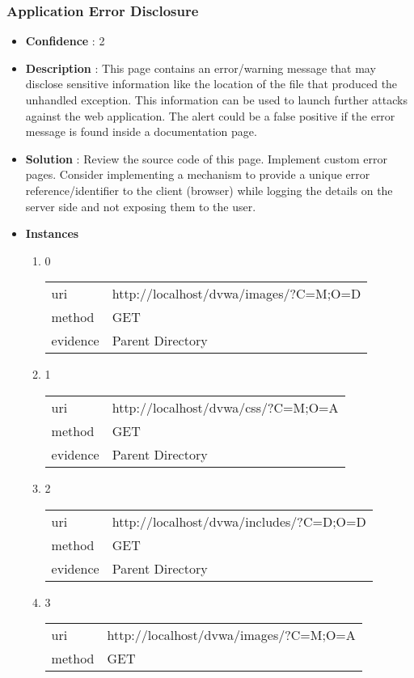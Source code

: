 \documentclass[10pt]{article}
\begin{document}
\subsubsection{Application Error Disclosure}
\begin{itemize}
\item[] \textbf{Confidence} : 2
\item[] \textbf{Description} : This page contains an error/warning message that may disclose sensitive information like the location of the file that produced the unhandled exception. This information can be used to launch further attacks against the web application. The alert could be a false positive if the error message is found inside a documentation page.
\item[] \textbf{Solution} :  Review the source code of this page. Implement custom error pages. Consider implementing a mechanism to provide a unique error reference/identifier to the client (browser) while logging the details on the server side and not exposing them to the user.
\item[] \textbf{Instances}
\begin{enumerate}
\item[] 0
\begin{tabular}{| l | p{12cm}}
uri & http://localhost/dvwa/images/?C=M;O=D \\
method & GET \\
evidence & Parent Directory \\
\end{tabular}
\item[] 1
\begin{tabular}{| l | p{12cm}}
uri & http://localhost/dvwa/css/?C=M;O=A \\
method & GET \\
evidence & Parent Directory \\
\end{tabular}
\item[] 2
\begin{tabular}{| l | p{12cm}}
uri & http://localhost/dvwa/includes/?C=D;O=D \\
method & GET \\
evidence & Parent Directory \\
\end{tabular}
\item[] 3
\begin{tabular}{| l | p{12cm}}
uri & http://localhost/dvwa/images/?C=M;O=A \\
method & GET \\

\end{tabular}
\end{enumerate}
\end{itemize}
\end{document}
